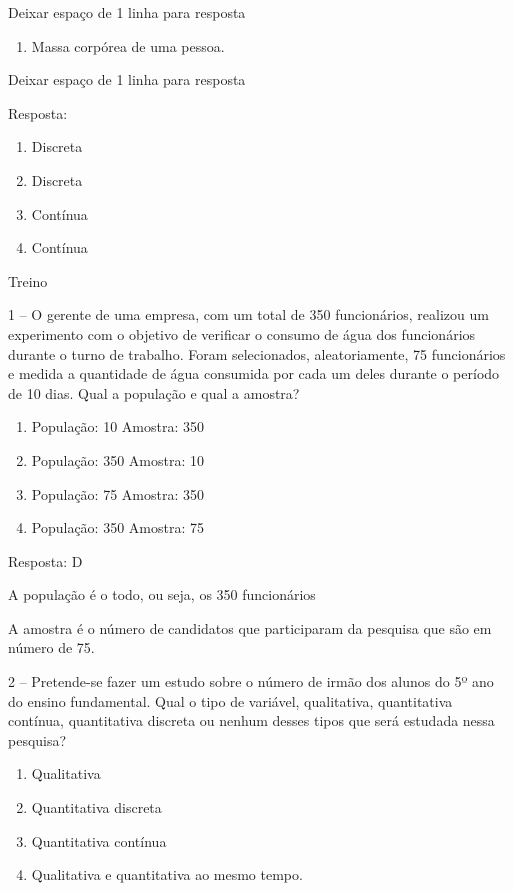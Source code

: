 Deixar espaço de 1 linha para resposta

\begin{enumerate}
\def\labelenumi{\alph{enumi})}
\item
  Massa corpórea de uma pessoa.
\end{enumerate}

Deixar espaço de 1 linha para resposta

Resposta:

\begin{enumerate}
\def\labelenumi{\alph{enumi})}
\item
  Discreta
\item
  Discreta
\item
  Contínua
\item
  Contínua
\end{enumerate}

Treino

1 -- O gerente de uma empresa, com um total de 350 funcionários,
realizou um experimento com o objetivo de verificar o consumo de água
dos funcionários durante o turno de trabalho. Foram selecionados,
aleatoriamente, 75 funcionários e medida a quantidade de água consumida
por cada um deles durante o período de 10 dias. Qual a população e qual
a amostra?

\begin{enumerate}
\def\labelenumi{\alph{enumi})}
\item
  População: 10 Amostra: 350
\item
  População: 350 Amostra: 10
\item
  População: 75 Amostra: 350
\item
  População: 350 Amostra: 75
\end{enumerate}

Resposta: D

A população é o todo, ou seja, os 350 funcionários

A amostra é o número de candidatos que participaram da pesquisa que são
em número de 75.

2 -- Pretende-se fazer um estudo sobre o número de irmão dos alunos do
5º ano do ensino fundamental. Qual o tipo de variável, qualitativa,
quantitativa contínua, quantitativa discreta ou nenhum desses tipos que
será estudada nessa pesquisa?

\begin{enumerate}
\def\labelenumi{\alph{enumi})}
\item
  Qualitativa
\item
  Quantitativa discreta
\item
  Quantitativa contínua
\item
  Qualitativa e quantitativa ao mesmo tempo.
\end{enumerate}

